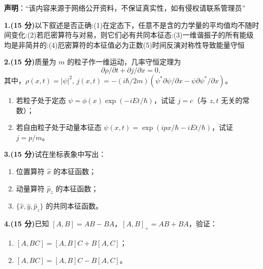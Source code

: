 
\textbf{声明}：“该内容来源于网络公开资料，不保证真实性，如有侵权请联系管理员”

\textbf{1.(15 分)}以下叙述是否正确:(1)在定态下，任意不是含的力学量的平均值均不随时间变化:(2)若厄密算符与对易，则它们必有共同本征态:(3)一维谐振子的所有能级均是非简并的:(4)厄密算符的本征值必为正数(5)时间反演对称性导致能量守恒

\textbf{2.(15 分)}质量为 $m$ 的粒子作一维运动，几率守恒定理为
\[
\partial \rho/\partial t + \partial j/\partial x = 0,~
\]
其中，$\rho(x,t) = |\psi|^2$, $j(x,t) = -(i\hbar/2m)(\psi^*\partial \psi/\partial x - \psi \partial \psi^*/\partial x)$。

\begin{enumerate}
    \item 若粒子处于定态 $\psi = \phi(x) \exp(-iEt/\hbar)$，试证 $j = c$（与 $z,t$ 无关的常数）；
    \item 若自由粒子处于动量本征态 $\psi(x,t) = \exp(ipx/\hbar - iEt/\hbar)$，试证 $j = p/m$。
\end{enumerate}

\textbf{3.(15 分)}试在坐标表象中写出：

\begin{enumerate}
    \item 位置算符 $\hat{x}$ 的本征函数；
    \item 动量算符 $\hat{p}_z$ 的本征函数；
    \item $\{\hat{x},\hat{y}, \hat{p}_z\}$ 的共同本征函数。
\end{enumerate}

\textbf{4.(15 分)}已知 $[A, B] = AB - BA$，$[A, B]_+ = AB + BA$，验证：

\begin{enumerate}
    \item $[A, BC] = [A, B]C + B[A, C]$；
    \item $[A, BC] = [A, B]C - B[A, C]$。
\end{enumerate}